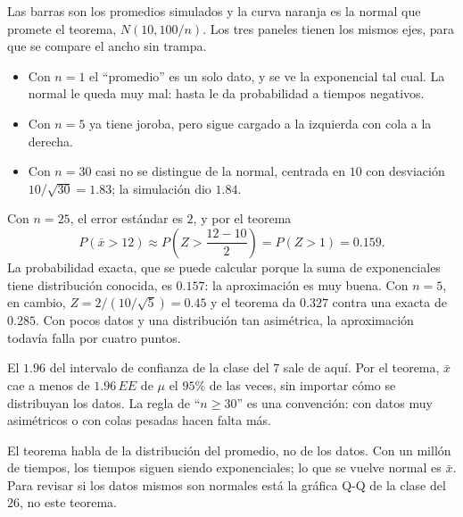 \documentclass[11pt,letterpaper]{article}
\begin{document}
Las barras son los promedios simulados y la curva naranja es la normal
que promete el teorema, $N(10, 100/n)$. Los tres paneles tienen los
mismos ejes, para que se compare el ancho sin trampa.

\begin{itemize}[itemsep=0.3em]
    \item Con $n = 1$ el ``promedio'' es un solo dato, y se ve la
          exponencial tal cual. La normal le queda muy mal: hasta le da
          probabilidad a tiempos negativos.
    \item Con $n = 5$ ya tiene joroba, pero sigue cargado a la
          izquierda con cola a la derecha.
    \item Con $n = 30$ casi no se distingue de la normal, centrada en
          $10$ con desviación $10 / \sqrt{30} = 1.83$; la simulación
          dio $1.84$.
\end{itemize}

\begin{ejemplo}
    Con $n = 25$, el error estándar es $2$, y por el teorema
    \[
        P(\bar{x} > 12)
        \approx P\left( Z > \frac{12 - 10}{2} \right)
        = P(Z > 1) = 0.159 .
    \]
    La probabilidad exacta, que se puede calcular porque la suma de
    exponenciales tiene distribución conocida, es $0.157$: la
    aproximación es muy buena. Con $n = 5$, en cambio,
    $Z = 2 / (10 / \sqrt{5}) = 0.45$ y el teorema da $0.327$ contra
    una exacta de $0.285$. Con pocos datos y una distribución tan
    asimétrica, la aproximación todavía falla por cuatro puntos.
\end{ejemplo}

\begin{idea}
    El $1.96$ del intervalo de confianza de la clase del $7$ sale de
    aquí. Por el teorema, $\bar{x}$ cae a menos de $1.96\,EE$ de $\mu$
    el $95\%$ de las veces, sin importar cómo se distribuyan los datos.
    La regla de ``$n \ge 30$'' es una convención: con datos muy
    asimétricos o con colas pesadas hacen falta más.
\end{idea}

\begin{ojo}
    El teorema habla de la distribución del promedio, no de los datos.
    Con un millón de tiempos, los tiempos siguen siendo exponenciales;
    lo que se vuelve normal es $\bar{x}$. Para revisar si los datos
    mismos son normales está la gráfica Q-Q de la clase del $26$, no
    este teorema.
\end{ojo}
\end{document}
